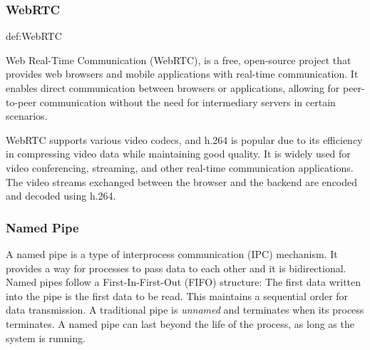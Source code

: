 \documentclass[../MasterThesis.tex]{subfiles}
\begin{document}
\subsubsection*{WebRTC} 

\begin{CountingDefinition}[WebRTC]{def:WebRTC}
	
	Web Real-Time Communication (WebRTC), is a free, open-source project that provides web browsers and mobile applications with real-time communication. It enables direct communication between browsers or applications, allowing for peer-to-peer communication without the need for intermediary servers in certain scenarios.
	
\end{CountingDefinition}

WebRTC supports various video codecs, and h.264 is popular due to its efficiency in compressing video data while maintaining good quality. It is widely used for video conferencing, streaming, and other real-time communication applications. The video streams exchanged between the browser and the backend are encoded and decoded using h.264.














\subsubsection*{Named Pipe} 

A named pipe is a type of interprocess communication (IPC) mechanism. It provides a way for processes to pass data to each other and it is bidirectional. 
Named pipes follow a First-In-First-Out (FIFO) structure: The first data written into the pipe is the first data to be read. This maintains a sequential order for data transmission.
A traditional pipe is \textit{unnamed} and terminates when its process terminates. A named pipe can last beyond the life of the process, as long as the system is running.~\cite{namedpipe}
\end{document}

